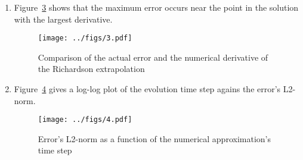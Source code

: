 \documentclass[12pt,a4]{article}
\begin{document}
\begin{enumerate}
\begin{enumerate}
      \item
        Figure~\ref{fig:2b} shows the relationship between the errors when evolving with different time steps.
        Halving the time step decreases the error by a factor of four.
        This relationship confirms that the second order Runge-Kutta method is indeed second order.
        \begin{figure}[H]
          \centering
          \texttt{[image: ../figs/2b.pdf]}
          \caption{Scaled global errors for RK2 evolution of a logistic equation using different time steps}
          \label{fig:2b}
        \end{figure}
      \item
        Figure~\ref{fig:1c} compares the actual global error of the logistic problem's RK2 evolution against the error estimated with the Richardson extrapolation.
        \begin{figure}[H]
          \centering
          \texttt{[image: ../figs/2c.pdf]}
          \caption{Comparison of the actual error with the difference between the Richardson extrapolation and numerical the solution}
          \label{fig:2c}
        \end{figure}
  \end{enumerate}
  \item
    Figure~\ref{fig:3} shows that the maximum error occurs near the point in the solution with the largest derivative.
    \begin{figure}[H]
      \centering
      \texttt{[image: ../figs/3.pdf]}
      \caption{Comparison of the actual error and the numerical derivative of the Richardson extrapolation}
      \label{fig:3}
    \end{figure}
  \item
    Figure~\ref{fig:4} gives a log-log plot of the evolution time step agains the error's L2-norm.
    \begin{figure}[H]
      \centering
      \texttt{[image: ../figs/4.pdf]}
      \caption{Error's L2-norm as a function of the numerical approximation's time step}
      \label{fig:4}
    \end{figure}
\end{enumerate}
\end{document}
